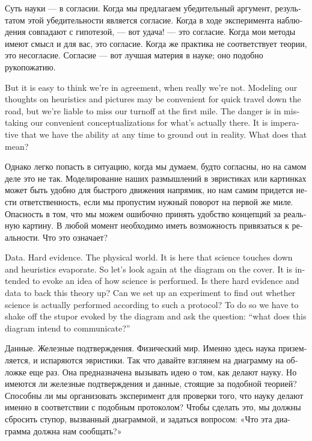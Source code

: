 \documentclass{book}
\theoremstyle{theoremENG}
\theoremstyle{lemmaENG}
\theoremstyle{propositionENG}
\theoremstyle{corollaryENG}
\theoremstyle{factENG}
\theoremstyle{remarkENG}
\theoremstyle{exampleENG}
\theoremstyle{warningENG}
\theoremstyle{questionENG}
\theoremstyle{guessENG}
\theoremstyle{answerENG}
\theoremstyle{constructionENG}
\theoremstyle{rulesENG}
\theoremstyle{excENG}
\theoremstyle{appENG}
\theoremstyle{definitionENG}
\theoremstyle{notationENG}
\theoremstyle{conjectureENG}
\theoremstyle{postulateENG}
\theoremstyle{theoremRUS}
\theoremstyle{lemmaRUS}
\theoremstyle{propositionRUS}
\theoremstyle{corollaryRUS}
\theoremstyle{factRUS}
\theoremstyle{remarkRUS}
\theoremstyle{exampleRUS}
\theoremstyle{warningRUS}
\theoremstyle{questionRUS}
\theoremstyle{guessRUS}
\theoremstyle{answerRUS}
\theoremstyle{constructionRUS}
\theoremstyle{rulesRUS}
\theoremstyle{excRUS}
\theoremstyle{appRUS}
\theoremstyle{definitionRUS}
\theoremstyle{notationRUS}
\theoremstyle{conjectureRUS}
\theoremstyle{postulateRUS}
\begin{document}
\begin{english}
\begin{russian} Суть науки — в согласии. Когда мы предлагаем убедительный аргумент,  результатом этой убедительности является согласие. Когда в ходе эксперимента наблюдения совпадают с гипотезой, — вот удача! — это согласие. Когда мои методы имеют смысл и для вас, это согласие. Когда же практика не соответствует теории, это несогласие. Согласие — вот лучшая материя в науке; оно подобно рукопожатию. \end{russian}

But it is easy to think we're in agreement, when really we're not. Modeling our thoughts on heuristics and pictures may be convenient for quick travel down the road, but we're liable to miss our turnoff at the first mile. The danger is in mistaking our convenient conceptualizations for what's actually there. It is imperative that we have the ability at any time to ground out in reality. What does that mean?

\begin{russian} Однако легко попасть в ситуацию, когда мы думаем, будто согласны, но на самом деле это не так. Моделирование наших размышлений в эвристиках или картинках может быть удобно для быстрого движения напрямик, но нам самим придется нести ответственность, если мы пропустим нужный поворот на первой же миле. Опасность в том, что мы можем ошибочно принять удобство концепций за реальную картину. В любой момент необходимо иметь возможность привязаться к реальности. Что это означает? \end{russian}

Data. Hard evidence. The physical world. It is here that science touches down and heuristics evaporate. So let's look again at the diagram on the cover. It is intended to evoke an idea of how science is performed. Is there hard evidence and data to back this theory up? Can we set up an experiment to find out whether science is actually performed according to such a protocol? To do so we have to shake off the stupor evoked by the diagram and ask the question: “what does this diagram intend to communicate?”

\begin{russian} Данные. Железные подтверждения. Физический мир. Именно здесь наука приземляется, и испаряются эвристики. Так что давайте взглянем на диаграмму на обложке еще раз. Она предназначена вызывать идею о том, как делают науку. Но имеются ли железные подтверждения и данные, стоящие за подобной теорией? Способны ли мы организовать эксперимент для проверки того, что науку делают именно в соответствии с подобным протоколом? Чтобы сделать это, мы должны сбросить ступор, вызванный диаграммой, и задаться вопросом: «Что эта диаграмма должна нам сообщать?» \end{russian}


\end{english}
\end{document}
